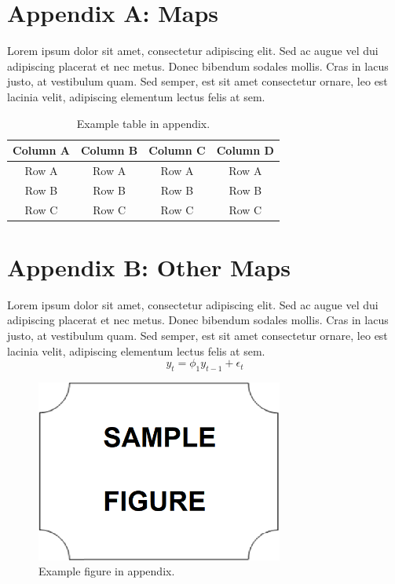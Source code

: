 
\chapter{Appendix A: Maps}

Lorem ipsum dolor sit amet, consectetur adipiscing elit. Sed ac augue vel dui 
adipiscing placerat et nec metus. Donec bibendum sodales mollis. Cras in lacus 
justo, at vestibulum quam. Sed semper, est sit amet consectetur ornare, leo est 
lacinia velit, adipiscing elementum lectus felis at sem.

\vspace{3pt}
\begin{table}[ht]
\centering
\setlength{\tabcolsep}{14pt}
\caption{Example table in appendix.}
\begin{tabular}{cccc}
\toprule\midrule
Column A & Column B & Column C & Column D \\
\hline
Row A & Row A & Row A & Row A \\
Row B & Row B & Row B & Row B \\
Row C & Row C & Row C & Row C \\
\bottomrule
\end{tabular}
\label{table:appendix}
\end{table}
\vspace{-6pt}

\chapter{Appendix B: Other Maps}

Lorem ipsum dolor sit amet, consectetur adipiscing elit. Sed ac augue vel dui 
adipiscing placerat et nec metus. Donec bibendum sodales mollis. Cras in lacus 
justo, at vestibulum quam. Sed semper, est sit amet consectetur ornare, leo est 
lacinia velit, adipiscing elementum lectus felis at sem.
%
\begin{equation}
    y_{t} = \phi_{1} y_{t-1} + \epsilon_{t}
\label{eq:appendix}
\end{equation}

\begin{figure}[ht]
    \centering
    \includegraphics[width=230pt,keepaspectratio=true]{./fig/sekil7}
    \caption{Example figure in appendix.}
    \label{fig:appendix}
\end{figure}
\vspace{-6pt}
    






